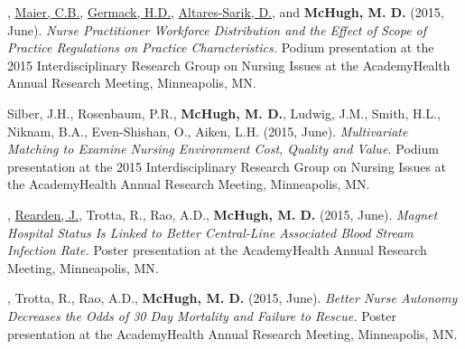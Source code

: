 \documentclass[10pt,]{article}
\begin{document}
{{{{{{{{{{{{{{{\begin{hangparas}{.25in}{1}
\end{hangparas}



\begin{hangparas}{.25in}{1}

, {\underline {Maier, C.B.}}, {\underline {Germack, H.D.}}, {\underline {Altares-Sarik, D.}}, and {\textbf {McHugh, M. D.}} (2015, June). {\textit {Nurse Practitioner Workforce Distribution and the Effect of Scope of Practice Regulations on Practice Characteristics.}} Podium presentation at the 2015 Interdisciplinary Research Group on Nursing Issues at the AcademyHealth Annual Research Meeting, Minneapolis, MN.

\end{hangparas}



\begin{hangparas}{.25in}{1}

\*Silber, J.H., Rosenbaum, P.R., {\textbf {McHugh, M. D.}}, Ludwig, J.M., Smith, H.L., Niknam, B.A., Even-Shishan, O., Aiken, L.H. (2015, June). {\textit {Multivariate Matching to Examine Nursing Environment Cost, Quality and Value.}} Podium presentation at the 2015 Interdisciplinary Research Group on Nursing Issues at the AcademyHealth Annual Research Meeting, Minneapolis, MN.

\end{hangparas}



\begin{hangparas}{.25in}{1}

, {\underline {Rearden, J.}}, Trotta, R., Rao, A.D., {\textbf {McHugh, M. D.}} (2015, June). {\textit {Magnet Hospital Status Is Linked to Better Central-Line Associated Blood Stream Infection Rate.}} Poster presentation at the AcademyHealth Annual Research Meeting, Minneapolis, MN.

\end{hangparas}



\begin{hangparas}{.25in}{1}

, Trotta, R., Rao, A.D., {\textbf {McHugh, M. D.}} (2015, June). {\textit {Better Nurse Autonomy Decreases the Odds of 30 Day Mortality and Failure to Rescue.}} Poster presentation at the AcademyHealth Annual Research Meeting, Minneapolis, MN.

\end{hangparas}



}}}}}}}}}}}}}}}
\end{document}
